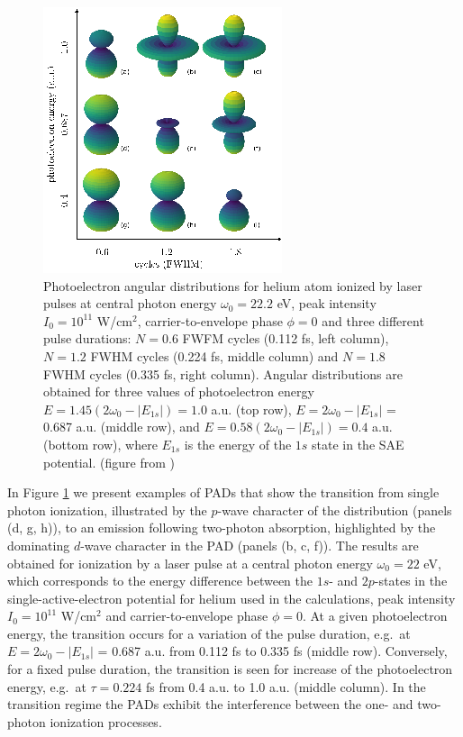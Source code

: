 \begin{figure}[!ht]
\centering
\includegraphics[width=0.5\linewidth]{figs/Photo_ionization/short_pulse/fig_1.png}
\caption{
Photoelectron angular distributions for helium atom ionized by laser pulses at central photon energy $\omega_0 = 22.2$ eV, peak intensity $I_0 = 10^{11}$ W/cm$^2$, carrier-to-envelope phase $\phi = 0$ and three different pulse durations: $N = 0.6$ FWFM cycles (0.112 fs, left column), $N = 1.2$ FWHM cycles (0.224 fs, middle column) and $N = 1.8$ FWHM cycles (0.335 fs, right column). Angular distributions are obtained for three values of photoelectron energy $E = 1.45(2\omega_0 - |E_{1s}|) = 1.0$ a.u. (top row), $E = 2\omega_0 - |E_{1s}|$ = 0.687 a.u. (middle row), and $E = 0.58(2\omega_0 - |E_{1s}|) = 0.4$ a.u. (bottom row), where $E_{1s}$ is the energy of the $1s$ state in the SAE potential. (figure from \cite{venzke2020_ionization})
} 
  \label{fig:pads}
\end{figure}

In Figure \ref{fig:pads} we present examples of PADs that show the transition from single photon ionization, illustrated by the $p$-wave character of the distribution (panels (d, g, h)), to an emission following two-photon absorption, highlighted by the dominating $d$-wave character in the PAD (panels (b, c, f)). The results are obtained for ionization by a laser pulse at a central photon energy $\omega_0 = 22$ eV, which corresponds to the energy difference between the $1s$- and $2p$-states in the single-active-electron potential for helium used in the calculations, peak intensity $I_0 = 10^{11}$ W/cm$^2$ and carrier-to-envelope phase $\phi = 0$. At a given photoelectron energy, the transition occurs for a variation of the pulse duration, e.g.\ at $E = 2\omega_0 - |E_{1s}|$ = 0.687 a.u. from 0.112 fs to 0.335 fs (middle row). Conversely, for a fixed pulse duration, the transition is seen for increase of the photoelectron energy, e.g.\ at $\tau = 0.224$ fs from 0.4 a.u. to 1.0 a.u. (middle column). In the transition regime the PADs exhibit the interference between the one- and two-photon ionization processes. 

